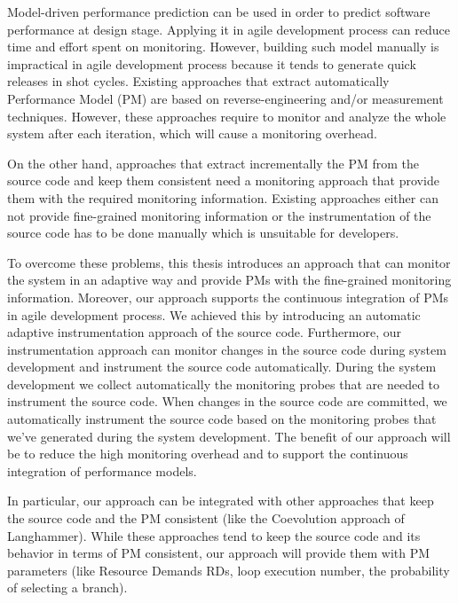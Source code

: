 
\Abstract
Model-driven performance prediction can be used in order to predict software performance at design stage. Applying it in agile development process can reduce time and effort spent on monitoring. However, building such model manually is impractical in agile development process because it tends to generate quick releases in shot cycles. Existing approaches that extract automatically Performance Model (PM) are based on reverse-engineering and/or measurement techniques. However, these approaches require to monitor and analyze the whole system after each iteration, which will cause a monitoring overhead. 

On the other hand, approaches that extract incrementally the PM from the source code and keep them consistent need a monitoring approach that provide them with the required monitoring information. Existing approaches either can not provide fine-grained monitoring information or the instrumentation of the source code has to be done manually which is unsuitable for developers.

To overcome these problems, this thesis introduces an approach that can monitor the system in an adaptive way and provide PMs with the fine-grained monitoring information. Moreover, our approach supports the continuous integration of PMs in agile development process. We achieved this by introducing an automatic adaptive instrumentation approach of the source code. Furthermore, our instrumentation approach can monitor changes in the source code during system development and instrument the source code automatically. During the system development we collect automatically the monitoring probes that are needed to instrument the source code. When changes in the source code are committed, we automatically instrument the source code based on the monitoring probes that we've generated during the system development. The benefit of our approach will be to reduce the high monitoring overhead and to support the continuous integration of performance models.  

In particular, our approach can be integrated with other approaches that keep the source code and the PM consistent (like the Coevolution approach of Langhammer). While these approaches tend to keep the source code and its behavior in terms of PM consistent, our approach will provide them with PM parameters (like Resource Demands RDs, loop execution number, the probability of selecting a branch).   